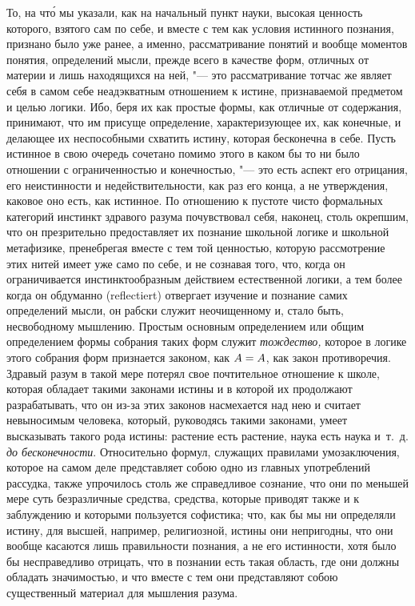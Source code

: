 То, на чт\'{о} мы указали, как на начальный пункт науки, высокая ценность
которого, взятого сам по себе, и вместе с тем как условия истинного познания,
признано было уже ранее, а именно, рассматривание понятий и вообще моментов
понятия, определений мысли, прежде всего в качестве форм, отличных от материи и
лишь находящихся на ней, "--- это рассматривание тотчас же являет себя в самом
себе неадэкватным отношением к истине, признаваемой предметом и целью логики.
Ибо, беря их как простые формы, как отличные от содержания, принимают, что им
присуще определение, характеризующее их, как конечные, и делающее их
неспособными схватить истину, которая бесконечна в себе. Пусть истинное в свою
очередь сочетано помимо этого в каком бы то ни было отношении с ограниченностью
и конечностью, "--- это есть аспект его отрицания, его неистинности и
недействительности, как раз его конца, а не утверждения, каковое оно есть, как
истинное. По отношению к пустоте чисто формальных категорий инстинкт здравого
разума почувствовал себя, наконец, столь окрепшим, что он презрительно
предоставляет их познание школьной логике и школьной метафизике, пренебрегая
вместе с тем той ценностью, которую рассмотрение этих нитей имеет уже само по
себе, и не сознавая того, что, когда он ограничивается инстинктообразным
действием естественной логики, а тем более когда он обдуманно (reflectiert)
отвергает изучение и познание самих определений мысли, он рабски служит
неочищенному и, стало быть, несвободному мышлению. Простым основным
определением или общим определением формы собрания таких форм служит
{\em тождество,} которое в логике этого собрания форм признается законом, как
$A\hm=A$, как закон противоречия. Здравый разум в такой мере потерял свое
почтительное отношение к школе, которая обладает такими законами истины и в
которой их продолжают разрабатывать, что он из-за этих законов насмехается над
нею и считает невыносимым человека, который, руководясь такими законами, умеет
высказывать такого рода истины: растение есть растение, наука есть наука
и~т.~д. {\em до бесконечности}. Относительно формул, служащих правилами
умозаключения, которое на самом деле представляет собою одно из главных
употреблений рассудка, также упрочилось столь же справедливое сознание, что они
по меньшей мере суть безразличные средства, средства, которые приводят также и
к заблуждению и которыми пользуется софистика; что, как бы мы ни определяли
истину, для высшей, например, религиозной, истины они непригодны, что они
вообще касаются лишь правильности познания, а не его истинности, хотя было бы
несправедливо отрицать, что в познании есть такая область, где они должны
обладать значимостью, и что вместе с тем они представляют собою существенный
материал для мышления разума.

